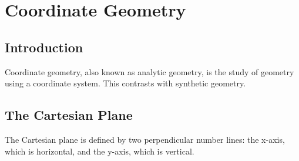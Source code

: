 \chapter{Coordinate Geometry}
\section{Introduction}
Coordinate geometry, also known as analytic geometry, is the study of geometry using a coordinate system. This contrasts with synthetic geometry.

\section{The Cartesian Plane}
The Cartesian plane is defined by two perpendicular number lines: the x-axis, which is horizontal, and the y-axis, which is vertical.


